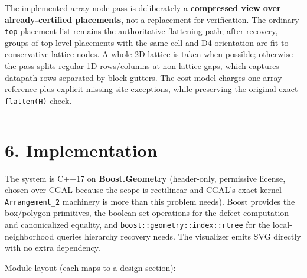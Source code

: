\documentclass[
  11pt,
]{article}
\begin{document}
The implemented array-node pass is deliberately a \textbf{compressed
view over already-certified placements}, not a replacement for
verification. The ordinary \texttt{top} placement list remains the
authoritative flattening path; after recovery, groups of top-level
placements with the same cell and D4 orientation are fit to conservative
lattice nodes. A whole 2D lattice is taken when possible; otherwise the
pass splits regular 1D rows/columns at non-lattice gaps, which captures
datapath rows separated by block gutters. The cost model charges one
array reference plus explicit missing-site exceptions, while preserving
the original exact \texttt{flatten(H)} check.

\begin{center}\rule{0.5\linewidth}{0.5pt}\end{center}

\section{6. Implementation}\label{implementation}

The system is C++17 on \textbf{Boost.Geometry} (header-only, permissive
license, chosen over CGAL because the scope is rectilinear and CGAL's
exact-kernel \texttt{Arrangement\_2} machinery is more than this problem
needs). Boost provides the box/polygon primitives, the boolean set
operations for the defect computation and canonicalized equality, and
\texttt{boost::geometry::index::rtree} for the local-neighborhood
queries hierarchy recovery needs. The visualizer emits SVG directly with
no extra dependency.

Module layout (each maps to a design section):
\end{document}
